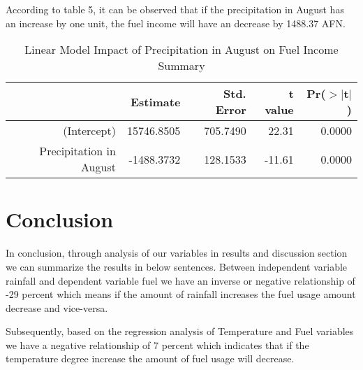 \documentclass[12pt, a4]{article}
\begin{document}
According to table 5, it can be observed that if the precipitation in August has an increase by one unit, the fuel income will have an decrease by 1488.37 AFN.

\begin{table}[ht]
\centering
\caption{ Linear Model Impact of Precipitation in August on Fuel Income Summary }
\begin{tabular}{rrrrr}
  \hline
 & Estimate & Std. Error & t value & Pr($>$$|$t$|$) \\ 
  \hline
(Intercept) & 15746.8505 & 705.7490 & 22.31 & 0.0000 \\ 
  Precipitation in August & -1488.3732 & 128.1533 & -11.61 & 0.0000 \\ 
   \hline
\end{tabular}
\end{table}

  

\section{Conclusion}

In conclusion, through analysis of our variables in results and discussion section we can summarize the results in below sentences.
Between independent variable rainfall and dependent variable fuel we have an inverse or negative relationship of -29 percent which means if the amount of rainfall increases the fuel usage amount decrease and vice-versa.

Subsequently, based on the regression analysis of Temperature and Fuel variables we have a negative relationship of 7 percent which indicates that if the temperature degree increase the amount of fuel usage will decrease.
\end{document}
